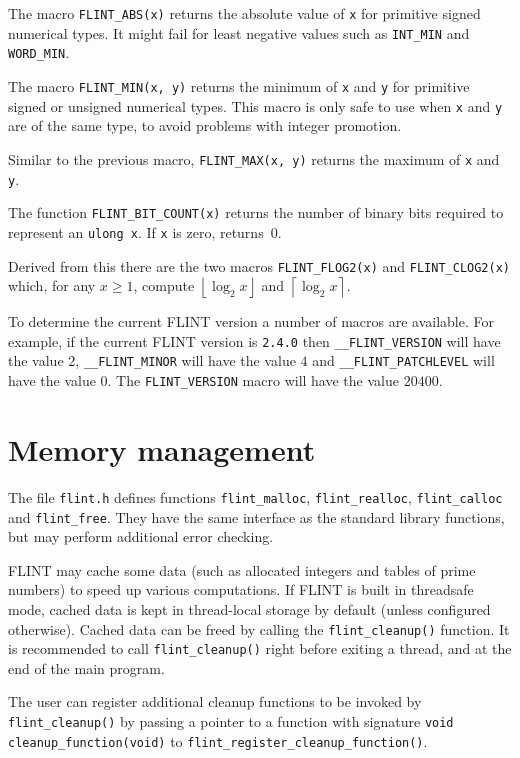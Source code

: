 \documentclass[a4paper,10pt]{book}
\providecommand{\floor}[1]{\left\lfloor#1\right\rfloor}%
\providecommand{\ceil}[1]{\left\lceil#1\right\rceil}%
\newcommand{\code}{\lstinline}
\begin{document}
The macro \code{FLINT_ABS(x)} returns the absolute value of \code{x}
for primitive signed numerical types.  It might fail for least negative
values such as \code{INT_MIN} and \code{WORD_MIN}.

The macro \code{FLINT_MIN(x, y)} returns the minimum of \code{x} and
\code{y} for primitive signed or unsigned numerical types.  This macro
is only safe to use when \code{x} and \code{y} are of the same type,
to avoid problems with integer promotion.

Similar to the previous macro, \code{FLINT_MAX(x, y)} returns the
maximum of \code{x} and \code{y}.

The function \code{FLINT_BIT_COUNT(x)} returns the number of binary bits
required to represent an \code{ulong x}.  If \code{x} is zero,
returns~$0$.

Derived from this there are the two macros \code{FLINT_FLOG2(x)} and
\code{FLINT_CLOG2(x)} which, for any $x \geq 1$, compute $\floor{\log_2{x}}$
and $\ceil{\log_2{x}}$.

To determine the current FLINT version a number of macros are available.
For example, if the current FLINT version is \code{2.4.0} then
\code{__FLINT_VERSION} will have the value $2$, \code{__FLINT_MINOR}
will have the value $4$ and \code{__FLINT_PATCHLEVEL} will have the value
$0$. The \code{FLINT_VERSION} macro will have the value $20400$.

\chapter{Memory management}

The file \code{flint.h} defines functions \code{flint_malloc},
\code{flint_realloc}, \code{flint_calloc} and \code{flint_free}.
They have the same interface as the standard library functions, but
may perform additional error checking.

FLINT may cache some data (such as allocated integers
and tables of prime numbers) to speed up various computations.
If FLINT is built in threadsafe mode, cached data is kept in thread-local
storage by default (unless configured otherwise). Cached data can be freed
by calling the \code{flint_cleanup()} function. It is recommended to call
\code{flint_cleanup()} right before exiting a thread, and at the end of the
main program.

The user can register additional cleanup functions to be invoked
by \code{flint_cleanup()} by passing a pointer
to a function with signature \code{void cleanup_function(void)}
to \code{flint_register_cleanup_function()}.
\end{document}
